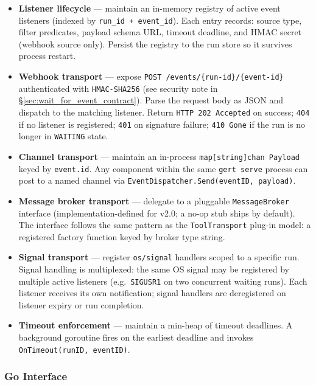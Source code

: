 \begin{itemize}
  \item \textbf{Listener lifecycle} — maintain an in-memory registry of active event listeners
        (indexed by \texttt{run\_id + event\_id}). Each entry records: source type, filter
        predicates, payload schema URL, timeout deadline, and HMAC secret (webhook source only).
        Persist the registry to the run store so it survives process restart.
  \item \textbf{Webhook transport} — expose \texttt{POST /events/\{run-id\}/\{event-id\}}
        authenticated with \texttt{HMAC-SHA256} (see security note in
        §\ref{sec:wait_for_event_contract}). Parse the request body as JSON and dispatch to
        the matching listener. Return \texttt{HTTP 202 Accepted} on success; \texttt{404} if
        no listener is registered; \texttt{401} on signature failure; \texttt{410 Gone} if
        the run is no longer in \texttt{WAITING} state.
  \item \textbf{Channel transport} — maintain an in-process \texttt{map[string]chan Payload}
        keyed by \texttt{event.id}. Any component within the same \texttt{gert serve} process
        can post to a named channel via \texttt{EventDispatcher.Send(eventID, payload)}.
  \item \textbf{Message broker transport} — delegate to a pluggable \texttt{MessageBroker}
        interface (implementation-defined for v2.0; a no-op stub ships by default). The
        interface follows the same pattern as the \texttt{ToolTransport} plug-in model: a
        registered factory function keyed by broker type string.
  \item \textbf{Signal transport} — register \texttt{os/signal} handlers scoped to a specific
        run. Signal handling is multiplexed: the same OS signal may be registered by multiple
        active listeners (e.g.\ \texttt{SIGUSR1} on two concurrent waiting runs). Each
        listener receives its own notification; signal handlers are deregistered on listener
        expiry or run completion.
  \item \textbf{Timeout enforcement} — maintain a min-heap of timeout deadlines. A background
        goroutine fires on the earliest deadline and invokes \texttt{OnTimeout(runID, eventID)}.
\end{itemize}

\subsubsection*{Go Interface}

